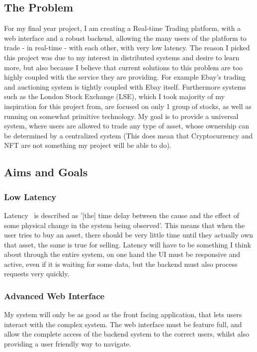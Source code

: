 \documentclass[titlepage]{article}
\begin{document}
\subsection{The Problem}
For my final year project, I am creating a Real-time Trading platform, with a web interface and a robust backend, allowing the many users of the platform to trade - in real-time - with each other, with very low latency. The reason I picked this project was due to my interest in distributed systems and desire to learn more, but also because I believe that current solutions to this problem are too highly coupled with the service they are providing. For example Ebay's trading and auctioning system is tightly coupled with Ebay itself. Furthermore systems such as the London Stock Exchange (LSE), which I took majority of my inspiration for this project from, are focused on only 1 group of stocks, as well as running on somewhat primitive technology. My goal is to provide a universal system, where users are allowed to trade any type of asset, whose ownership can be determined by a centralized system (This does mean that Cryptocurrency and NFT are not something my project will be able to do).

\subsection{Aims and Goals}

\subsubsection{Low Latency}
Latency~\cite{latency} is described as '[the] time delay between the cause and the effect of some physical change in the system being observed'. This means that when the user tries to buy an asset, there should be very little time until they actually own that asset, the same is true for selling. Latency will have to be something I think about through the entire system, on one hand the UI must be responsive and active, even if it is waiting for some data, but the backend must also process requests very quickly.

\subsubsection{Advanced Web Interface}
My system will only be as good as the front facing application, that lets users interact with the complex system. The web interface must be feature full, and allow the complete access of the backend system to the correct users, whilst also providing a user friendly way to navigate.
\end{document}
